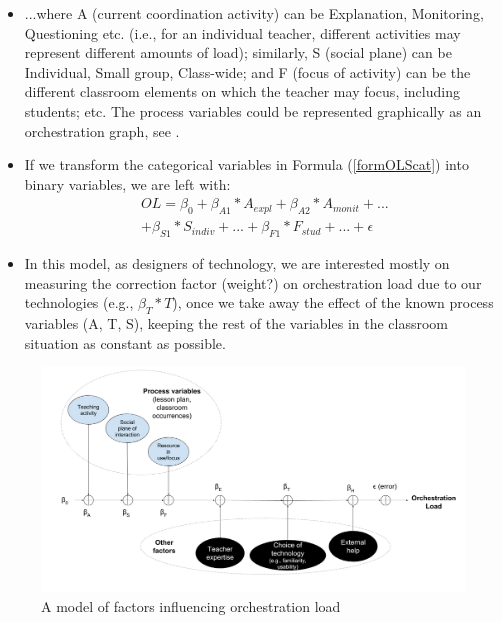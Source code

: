 \documentclass[10pt,journal,compsoc]{IEEEtran}
\begin{document}
\begin{itemize}
\item ...where A (current coordination activity) can be Explanation, Monitoring, Questioning etc. (i.e., for an individual teacher, different activities may represent different amounts of load); similarly, S (social plane) can be Individual, Small group, Class-wide; and F (focus of activity) can be the different classroom elements on which the teacher may focus, including students; etc. The process variables could be represented graphically as an orchestration graph, see \cite{prieto2011recurrent;dillenbourg2015orchestration}. 
\item If we transform the categorical variables in Formula (\ref{formOLScat}) into binary variables, we are left with:
\begin{multline}
\label{formOLS}
OL = \beta_0 + \beta_{A1}*A_{expl} + \beta_{A2}*A_{monit} + ... \\ + \beta_{S1}*S_{indiv} + ... + \beta_{F1}*F_{stud} + ... + \epsilon
\end{multline}
\item In this model, as designers of technology, we are interested mostly on measuring the correction factor (weight?) on orchestration load due to our technologies (e.g., $\beta_T*T$), once we take away the effect of the known process variables (A, T, S), keeping the rest of the variables in the classroom situation as constant as possible.
\end{itemize}


\begin{figure}[!t]
\centering
\includegraphics[width=\linewidth]{img/ModelFactorsOL}
\caption{A model of factors influencing orchestration load}
\label{fig:model}
\end{figure}
\end{document}
